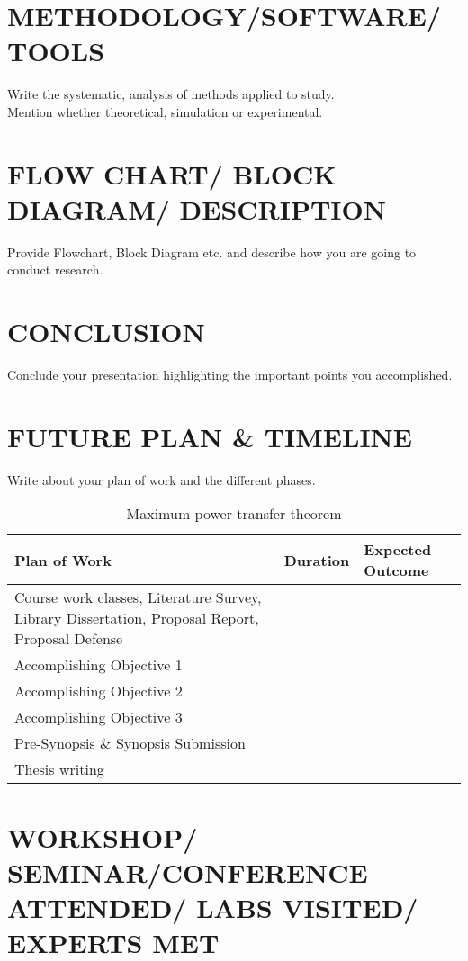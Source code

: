 \section{METHODOLOGY/SOFTWARE/TOOLS}
Write the systematic, analysis of methods applied to study.\\
Mention whether theoretical, simulation or experimental.


\section{FLOW CHART/ BLOCK DIAGRAM/ DESCRIPTION}
Provide Flowchart, Block Diagram etc. and describe how you are going to conduct research.

\section{CONCLUSION}
Conclude your presentation highlighting the important points you accomplished.

\section*{FUTURE PLAN \& TIMELINE}

Write about your plan of work and the different phases. 
\begin{table}[!ht]
	\centering
	\caption{Maximum power transfer theorem}
	\begin{tabular}{|p{5cm}|x{3cm}|x{4.5cm}|}
		\hline 
		\textbf{Plan of Work} & \textbf{Duration } & \textbf{Expected Outcome}\\ 
		\hline 
		Course work classes, Literature Survey, Library Dissertation, Proposal Report, Proposal Defense  &&\\
		\hline 
		Accomplishing Objective 1    &&\\
		\hline 
		Accomplishing Objective 2    &&\\
		\hline
		Accomplishing Objective 3    &&\\
		\hline 
		Pre-Synopsis \& Synopsis Submission&&\\
		\hline 
		Thesis writing &&\\
		\hline 

	\end{tabular} 
	\label{tab:odp}%
\end{table}%


\section*{WORKSHOP/ SEMINAR/CONFERENCE ATTENDED/ LABS VISITED/ EXPERTS MET }

